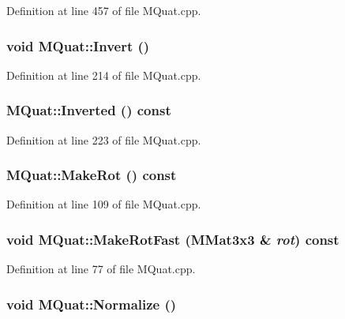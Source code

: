 Definition at line 457 of file MQuat.cpp.\hypertarget{class_m_quat_fee8bfad4412a9f64fc3a493dcfc1152}{
\subsubsection[{Invert}]{\setlength{\rightskip}{0pt plus 5cm}void MQuat::Invert ()}}
\label{class_m_quat_fee8bfad4412a9f64fc3a493dcfc1152}




Definition at line 214 of file MQuat.cpp.\hypertarget{class_m_quat_e06b631563df1502b73008829e33f278}{
\subsubsection[{Inverted}]{ MQuat::Inverted () const}}
\label{class_m_quat_e06b631563df1502b73008829e33f278}




Definition at line 223 of file MQuat.cpp.\hypertarget{class_m_quat_c72f53b8d276a8cfe6b6426e9c01909c}{
\subsubsection[{MakeRot}]{ MQuat::MakeRot () const}}
\label{class_m_quat_c72f53b8d276a8cfe6b6426e9c01909c}




Definition at line 109 of file MQuat.cpp.\hypertarget{class_m_quat_aa5548b76fe9f7c711792010bf5e6420}{
\subsubsection[{MakeRotFast}]{\setlength{\rightskip}{0pt plus 5cm}void MQuat::MakeRotFast ({\bf MMat3x3} \& {\em rot}) const}}
\label{class_m_quat_aa5548b76fe9f7c711792010bf5e6420}




Definition at line 77 of file MQuat.cpp.\hypertarget{class_m_quat_cba836d9852fe104543d68f9dab2aaaf}{
\subsubsection[{Normalize}]{\setlength{\rightskip}{0pt plus 5cm}void MQuat::Normalize ()}}
\label{class_m_quat_cba836d9852fe104543d68f9dab2aaaf}




